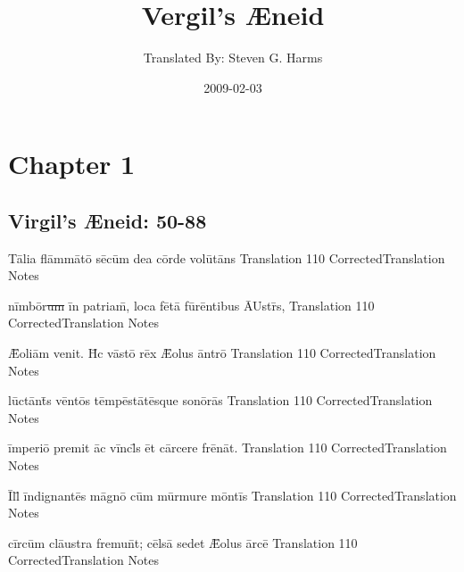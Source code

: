 \documentclass[]{book}
\title{Vergil's {\AE}neid}
\author{ Translated By:  Steven G. Harms }
\date{2009-02-03}
\begin{document}

\ifpdf
{}
\else
{}
\fi

\enumstyle 

\maketitle
\tableofcontents

\chapter{Chapter 1}
%
%
%
\newpage
\section{Virgil's {\AE}neid:  50-88} %

\latline
  {T\={\macron a}l\-i\-a fl\=amm\={\macron a}t\={\macron o} s\={\macron e}c\=um d\-e\-a c\=ord\-e v\-ol\={\macron u}t\={\macron a}ns
}
  { Translation }
  {110}
  { CorrectedTranslation }
  { Notes }


\latline
  {n\=imb\={\macron o}r\sout{um }\=in p\-atr\-ia\=m, l\-oc\-a f\={\macron e}t\=a f\=ur\=ent\-ib\-us \={AU}str\={\macron {\i}}s,}
  { Translation }
  {110}
  { CorrectedTranslation }
  { Notes }


\latline
  {\={\AE}\-ol\-i\=am v\-en\-it.  H\={\macron {\i}}c v\=ast\={\macron o} r\={\macron e}x \={\AE}\-ol\-us \=antr\={\macron o}}
  { Translation }
  {110}
  { CorrectedTranslation }
  { Notes }

\newpage

\latline
  {l\=uct\=ant\={\macron {\i}}s v\=ent\={\macron o}s t\=emp\=est\={\macron a}t\={\macron e}squ\-e s\-on\={\macron o}r\={\macron a}s
}
  { Translation }
  {110}
  { CorrectedTranslation }
  { Notes }


\latline
  {\=imp\-er\-i\={\macron o} pr\-em\-it \=ac v\=incl\={\macron {\i}}s \=et c\=arc\-er\-e fr\={\macron e}n\=at.
}
  { Translation }
  {110}
  { CorrectedTranslation }
  { Notes }


\latline
  {\=Ill\={\macron {\i}} \=ind\-ign\-ant\={\macron e}s m\=agn\={\macron o} c\=um m\=urm\-ur\-e m\=ont\=is
}
  { Translation }
  {110}
  { CorrectedTranslation }
  { Notes }

\newpage
\latline
  {c\=irc\=um cl\={au}str\-a fr\-emu\=nt; c\=els\={\macron a} s\-ed\-et \={\AE}\-ol\-us \=arc\=e
}
  { Translation }
  {110}
  { CorrectedTranslation }
  { Notes }
\end{document}
